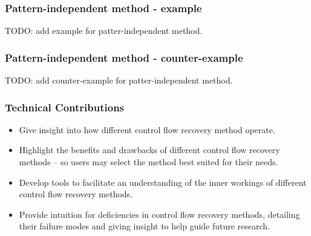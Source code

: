 \documentclass[aspectratio=1610]{beamer}
\begin{document}
\begin{frame}
	\frametitle{Pattern-independent method - example}

	TODO: add example for patter-independent method.
\end{frame}

\begin{frame}
	\frametitle{Pattern-independent method - counter-example}

	TODO: add counter-example for patter-independent method.
\end{frame}


\begin{frame}
	\frametitle{Technical Contributions}

	\begin{itemize}
		\item Give insight into how different control flow recovery method operate.
		\item Highlight the benefits and drawbacks of different control flow recovery methods -- so users may select the method best suited for their needs.
		\item Develop tools to facilitate an understanding of the inner workings of different control flow recovery methods.
		\item Provide intuition for deficiencies in control flow recovery methods, detailing their failure modes and giving insight to help guide future research.
	\end{itemize}


\end{frame}

\end{document}
